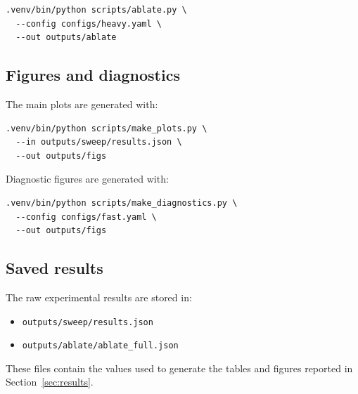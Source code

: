 \documentclass[12pt,a4paper]{article}
\begin{document}
\begin{verbatim}
.venv/bin/python scripts/ablate.py \
  --config configs/heavy.yaml \
  --out outputs/ablate
\end{verbatim}

\subsection{Figures and diagnostics}
The main plots are generated with:

\begin{verbatim}
.venv/bin/python scripts/make_plots.py \
  --in outputs/sweep/results.json \
  --out outputs/figs
\end{verbatim}

Diagnostic figures are generated with:

\begin{verbatim}
.venv/bin/python scripts/make_diagnostics.py \
  --config configs/fast.yaml \
  --out outputs/figs
\end{verbatim}

\subsection{Saved results}
The raw experimental results are stored in:

\begin{itemize}
    \item \texttt{outputs/sweep/results.json}
    \item \texttt{outputs/ablate/ablate\_full.json}
\end{itemize}

These files contain the values used to generate the tables and figures reported in
Section~\ref{sec:results}.
\end{document}
